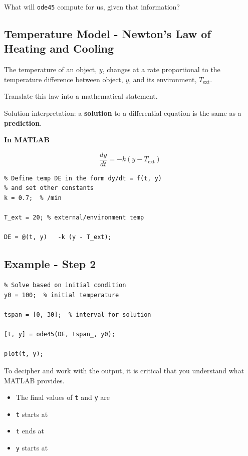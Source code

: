 \problem What will \verb#ode45# compute for us, given that
information?
\vfill
\vfill

\newpage

\subsection*{Temperature Model - Newton's Law of Heating and Cooling}

The temperature of an object, $y$, changes at a rate proportional to
the temperature difference between object, $y$, and its environment,
$T_{\mbox{ext}}$.

\problem Translate this law into a mathematical statement.

\vfill Solution interpretation: a {\bf solution} to a differential
equation is the same as a {\bf prediction}.  \vspace{1.5in}

\newpage 

{\bf In MATLAB}

$$\frac{dy}{dt} = -k (y - T_{\mbox{ext}})$$


\begin{verbatim}
% Define temp DE in the form dy/dt = f(t, y)
% and set other constants
k = 0.7;  % /min

T_ext = 20; % external/environment temp

DE = @(t, y)   -k (y - T_ext);

\end{verbatim}

\newpage

\subsection*{Example - Step 2}
\begin{verbatim}
% Solve based on initial condition
y0 = 100;  % initial temperature

tspan = [0, 30];  % interval for solution

[t, y] = ode45(DE, tspan_, y0);

plot(t, y);
\end{verbatim}

\newpage

To decipher and work with the output, it is critical that you
understand what MATLAB provides.  
\begin{itemize}
\item The final values of \verb#t# and \verb#y# are 
\vfill
\item \verb#t# starts at
\vfill
\item \verb#t# ends at
\vfill
\item \verb#y# starts at
\vfill
\end{itemize}

